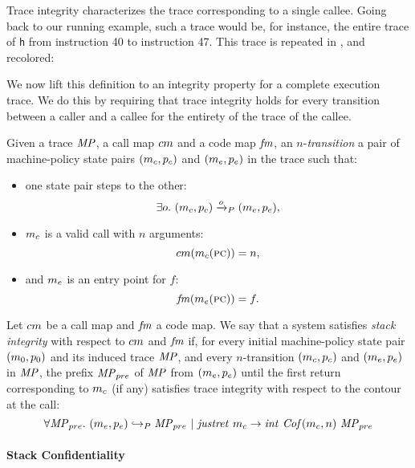 \documentclass[acmsmall,review,anonymous]{acmart}\settopmatter{printfolios=true,printccs=false,printacmref=false}
\begin{document}
Trace integrity characterizes the trace corresponding to a single
callee. Going back to our running example, such a trace would be, for
instance, the entire trace of {\tt h} from instruction 40 to
instruction 47. This trace is repeated in , and
recolored: 

We now lift this definition to an integrity property for a complete
execution trace. We do this by requiring that trace integrity holds
for every transition between a caller and a callee for the entirety of
the trace of the callee.

 Given a trace $\mathit{MP}$, a call map $cm$ and
a code map $\mathit{fm}$, an $n$-{\em transition} a pair of
machine-policy state pairs $(m_c, p_c)$ and $(m_e, p_e)$
in the trace such that:
\begin{itemize}
\item one state pair steps to the other:
  $$\exists o. ~ (m_c, p_c) \xrightarrow{o}_P (m_e, p_e),$$
\item $m_c$ is a valid call with $n$ arguments:
  $$cm(m_c(\textsc{pc})) = n,$$
\item and $m_e$ is an entry point for $f$:
  $$\mathit{fm}(m_e(\textsc{pc})) = f.$$
\end{itemize}

 Let $cm$ be a call map and
$\mathit{fm}$ a code map. We say that a system satisfies {\em stack
  integrity} with respect to $cm$ and $\mathit{fm}$ if, for every
initial machine-policy state pair $(m_0, p_0)$ and its induced
trace $\mathit{MP}$, and every $n$-transition $(m_c, p_c)$ and
$(m_e, p_e)$ in $\mathit{MP}$, the prefix $\mathit{MP}_{pre}$ of $\mathit{MP}$ from
$(m_e, p_e)$ until the first return corresponding to $m_c$
(if any) satisfies trace integrity with respect to the contour at the
call:
%
$$\forall \mathit{MP}_{pre}. ~ (m_e,p_e) \hookrightarrow_P
\mathit{MP}_{pre} ~ | ~ \mathit{justret}\ m_c \rightarrow
\mathit{int}~\mathit{Cof}(m_c, n)~\mathit{MP}_{pre}$$

\paragraph*{Stack Confidentiality}
\end{document}
